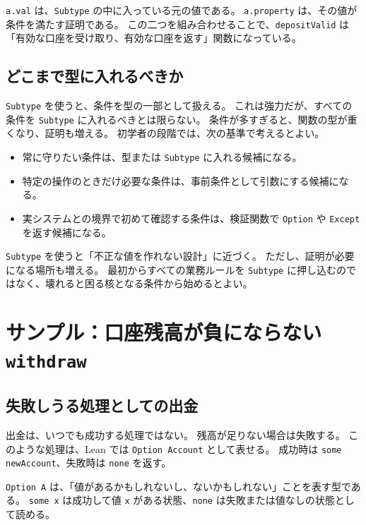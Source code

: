 \texttt{a.val} は、\texttt{Subtype} の中に入っている元の値である。
\texttt{a.property} は、その値が条件を満たす証明である。
この二つを組み合わせることで、\texttt{depositValid} は「有効な口座を受け取り、有効な口座を返す」関数になっている。

\subsection{どこまで型に入れるべきか}

\texttt{Subtype} を使うと、条件を型の一部として扱える。
これは強力だが、すべての条件を \texttt{Subtype} に入れるべきとは限らない。
条件が多すぎると、関数の型が重くなり、証明も増える。
初学者の段階では、次の基準で考えるとよい。

\begin{itemize}
\item 常に守りたい条件は、型または \texttt{Subtype} に入れる候補になる。
\item 特定の操作のときだけ必要な条件は、事前条件として引数にする候補になる。
\item 実システムとの境界で初めて確認する条件は、検証関数で \texttt{Option} や \texttt{Except} を返す候補になる。
\end{itemize}

\begin{warningbox}
\texttt{Subtype} を使うと「不正な値を作れない設計」に近づく。
ただし、証明が必要になる場所も増える。
最初からすべての業務ルールを \texttt{Subtype} に押し込むのではなく、壊れると困る核となる条件から始めるとよい。
\end{warningbox}


\section{サンプル：口座残高が負にならない \texttt{withdraw}}

\subsection{失敗しうる処理としての出金}

出金は、いつでも成功する処理ではない。
残高が足りない場合は失敗する。
このような処理は、Lean では \texttt{Option Account} として表せる。
成功時は \texttt{some newAccount}、失敗時は \texttt{none} を返す。

\begin{leanbox}
\texttt{Option A} は、「値があるかもしれないし、ないかもしれない」ことを表す型である。
\texttt{some x} は成功して値 \texttt{x} がある状態、\texttt{none} は失敗または値なしの状態として読める。
\end{leanbox}


